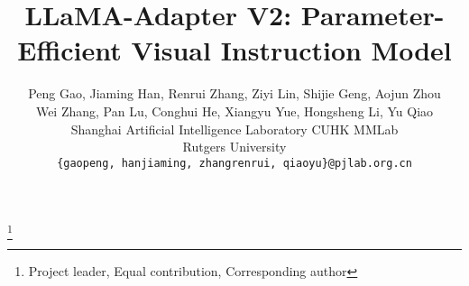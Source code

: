 \documentclass[10pt,twocolumn,letterpaper]{article}
\newcommand\blfootnote[1]{\begingroup
  \renewcommand\thefootnote{}\footnote{#1}\addtocounter{footnote}{-1}\endgroup
}
\begin{document}
\title{LLaMA-Adapter V2: Parameter-Efficient Visual Instruction Model}

\author{
Peng Gao, Jiaming Han, Renrui Zhang, Ziyi Lin, Shijie Geng, Aojun Zhou \\ Wei Zhang, Pan Lu, Conghui He, Xiangyu Yue, Hongsheng Li, Yu Qiao\vspace{0.2cm}\\
Shanghai Artificial Intelligence Laboratory\quad 
CUHK MMLab\\
Rutgers University\\
\texttt{\small \{gaopeng, hanjiaming, zhangrenrui, qiaoyu\}@pjlab.org.cn}
}
\maketitle

\blfootnote{Project leader,  Equal contribution,  Corresponding author}


\end{document}
